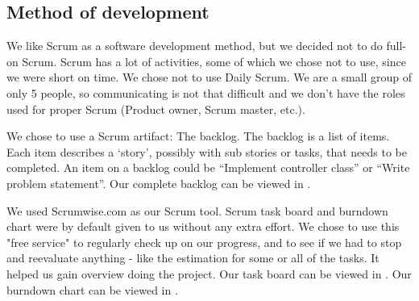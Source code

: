 \subsection{Method of development}
We like Scrum as a software development method, but we decided not to do full-on Scrum. Scrum has a lot of activities, some of which we chose not to use, since we were short on time. We chose not to use Daily Scrum. We are a small group of only 5 people, so communicating is not that difficult and we don't have the roles used for proper Scrum (Product owner, Scrum master, etc.).

We chose to use a Scrum artifact: The backlog. The backlog is a list of items. Each item describes a `story', possibly with sub stories or tasks, that needs to be completed. An item on a backlog could be ``Implement controller class'' or ``Write problem statement''. Our complete backlog can be viewed in .

We used Scrumwise.com as our Scrum tool. Scrum task board and burndown chart were by default given to us without any extra effort. We chose to use this "free service" to regularly check up on our progress, and to see if we had to stop and reevaluate anything - like the estimation for some or all of the tasks. It helped us gain overview doing the project. Our task board can be viewed in . Our burndown chart can be viewed in .